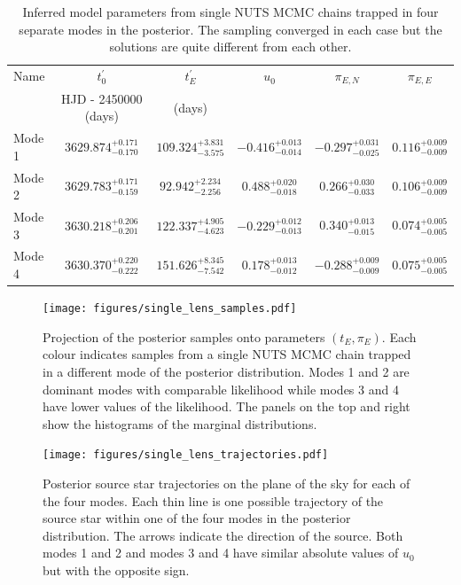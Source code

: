 \documentclass[12pt,dvipsnames]{report}
\begin{document}
\begin{table}[h!]
\centering
\begin{tabular}{l c c c c c} 
 \toprule
Name & $t_0^\prime$ & $t_E^\prime$ & $u_0$ & $\pi_{E,N}$ &$\pi_{E,E}$ \\
&HJD - 2450000 (days) & (days) &&&\\
 \midrule
 Mode 1 & $3629.874_{-0.170}^{+0.171}$&$109.324_{-3.575}^{+3.831}$&$-0.416_{-0.014}^{+0.013}$&$-0.297_{-0.025}^{+0.031}$&$0.116_{-0.009}^{+0.009}$\\
 Mode 2 & $3629.783_{-0.159}^{+0.171}$&$92.942_{-2.256}^{+2.234}$&$0.488_{-0.018}^{+0.020}$&$0.266_{-0.033}^{+0.030}$&$0.106_{-0.009}^{+0.009}$\\
 Mode 3 & $3630.218_{-0.201}^{+0.206}$&$122.337_{-4.623}^{+4.905}$&$-0.229_{-0.013}^{+0.012}$&$0.340_{-0.015}^{+0.013}$&$0.074_{-0.005}^{+0.005}$\\
 Mode 4 & $3630.370_{-0.222}^{+0.220}$ & $151.626_{-7.542}^{+8.345}$ & $0.178_{-0.012}^{+0.013}$ & $-0.288_{-0.009}^{+0.009}$ & $0.075_{-0.005}^{+0.005}$\\
\bottomrule
\end{tabular}
\caption{
    Inferred model parameters from single NUTS MCMC chains trapped in four separate modes in 
    the posterior. The sampling converged in each case but the solutions are quite 
    different from each other.
}
\label{tab:parameters_four_chains}
\end{table}

\begin{figure}[t]
    \begin{centering}
        \texttt{[image: figures/single\_lens\_samples.pdf]}
        \caption{
            Projection of the posterior samples onto parameters $(t_E, \pi_E)$.
            Each colour indicates samples from a single NUTS MCMC chain trapped 
            in a different mode of the posterior distribution. Modes 1 and 2 
            are dominant modes with comparable likelihood while modes 3 and 4
            have lower values of the likelihood. The panels on the top and right 
            show the histograms of the marginal distributions.
        }
            \label{fig:ogle_lightcurve_fit_samples}
    \end{centering}
\end{figure}

\begin{figure}[t]
    \begin{centering}
        \texttt{[image: figures/single\_lens\_trajectories.pdf]}
        \caption{Posterior source star trajectories on the plane of the sky for each
        of the four modes. Each thin line is one possible trajectory of the source star 
        within one of the four modes in the posterior distribution. The arrows indicate 
        the direction of the source. Both modes 1 and 2 and modes 3 and 4 have similar 
        absolute values of $u_0$ but with the opposite sign. }
            \label{fig:ogle_lightcurve_fit_trajectories}
    \end{centering}
\end{figure}
\end{document}
